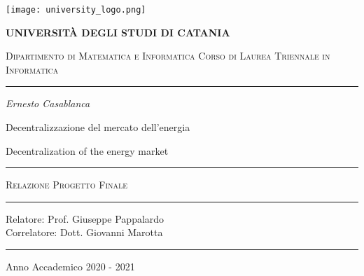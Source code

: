 \begin{titlepage}
    \centering 
    \texttt{[image: university\_logo.png]}

    \bigskip

    {\Large \textbf{UNIVERSIT\`A DEGLI STUDI DI CATANIA}}

    {\scshape
        \large
        Dipartimento di Matematica e Informatica
    }
    {\scshape
        \normalsize
        Corso di Laurea Triennale in Informatica
    }

    \bigskip

    \hrule

    \bigskip
    \bigskip
    \bigskip
    \bigskip

    {\itshape
        \large
        Ernesto Casablanca
        \par}

    \bigskip
    \bigskip
    \bigskip
    \bigskip

    {\centering
        \Large
        Decentralizzazione del mercato dell'energia
        \par}
    {\centering
        Decentralization of the energy market
        \par}

    \bigskip
    \bigskip
    \bigskip
    \bigskip
    \bigskip
    \bigskip

    \begin{minipage}[b]{8 cm}
        \hrule
        \bigskip
        {\centering\scshape
            Relazione Progetto Finale
            \par}
        \bigskip
        \hrule
    \end{minipage}

    \bigskip
    \bigskip
    \bigskip
    \bigskip
    \bigskip
    \bigskip
    \bigskip
    \bigskip
    \bigskip
    \bigskip
    \bigskip

    {\raggedleft
        Relatore: Prof. Giuseppe Pappalardo \\
        Correlatore: Dott. Giovanni Marotta
        \par}

    \bigskip
    \bigskip
    \bigskip
    \bigskip

    \hrule

    \bigskip

    {\centering
        Anno Accademico 2020 - 2021
        \par}

\end{titlepage}
